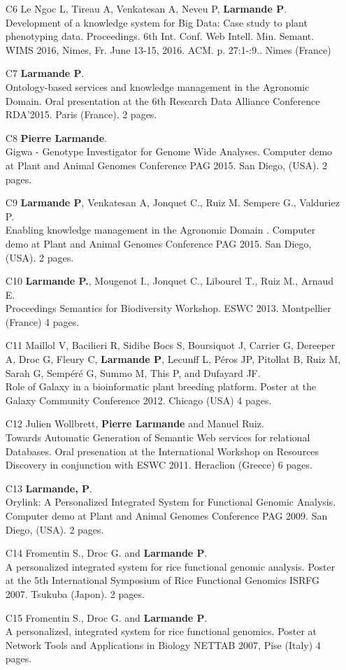 \begin{itemize}
\item [C6]	Le Ngoc L, Tireau A, Venkatesan A, Neveu P, \textbf{Larmande P}.\\ Development of a knowledge system for Big Data: Case study to plant phenotyping data. Proceedings. 6th Int. Conf. Web Intell. Min. Semant. WIMS 2016, Nimes, Fr. June 13-15, 2016. ACM. p. 27:1-:9.. Nimes (France) 
\item [C7]	\textbf{Larmande P}.\\ Ontology-based services and knowledge management in the Agronomic Domain. Oral presentation at the 6th Research Data Alliance Conference RDA’2015. Paris (France). 2 pages.
\item [C8]	\textbf{Pierre Larmande}.\\ Gigwa - Genotype Investigator for Genome Wide Analyses. Computer demo at Plant and Animal Genomes Conference PAG 2015. San Diego, (USA). 2 pages.
\item [C9]	\textbf{Larmande P}, Venkatesan A, Jonquet C., Ruiz M. Sempere G., Valduriez P.\\ Enabling knowledge management in the Agronomic Domain . Computer demo at Plant and Animal Genomes Conference PAG 2015. San Diego, (USA). 2 pages.
\item [C10]	\textbf{Larmande P.}, Mougenot I., Jonquet C., Libourel T., Ruiz M., Arnaud E.\\ Proceedings Semantics for Biodiversity Workshop. ESWC 2013. Montpellier (France) 4 pages.
\item [C11]	Maillol V, Bacilieri R, Sidibe Bocs S, Boursiquot J, Carrier G, Dereeper A, Droc G, Fleury C, \textbf{Larmande P}, Lecunff L, Péros JP, Pitollat B, Ruiz M, Sarah G, Sempéré G, Summo M, This P, and Dufayard JF.\\ Role of Galaxy in a bioinformatic plant breeding platform. Poster at the Galaxy Community Conference 2012. Chicago (USA) 4 pages.
\item [C12]	Julien Wollbrett, \textbf{Pierre Larmande} and Manuel Ruiz.\\ Towards Automatic Generation of Semantic Web services for relational Databases. Oral presenation at the International Workshop on Resources Discovery in conjunction with ESWC 2011. Heraclion (Greece) 6 pages.
\item [C13]	\textbf{Larmande, P}.\\ Orylink: A Personalized Integrated System for Functional Genomic Analysis. Computer demo at Plant and Animal Genomes Conference PAG 2009. San Diego, (USA). 2 pages.
\item [C14]	Fromentin S., Droc G. and \textbf{Larmande P}.\\ A personalized integrated system for rice functional genomic analysis. Poster at the 5th International Symposium of Rice Functional Genomics ISRFG 2007. Tsukuba (Japon). 2 pages.
\item [C15]	Fromentin S., Droc G. and \textbf{Larmande P}.\\ A personalized, integrated system for rice functional genomics. Poster at Network Tools and Applications in Biology NETTAB 2007, Pise (Italy) 4 pages.
\end{itemize} 

